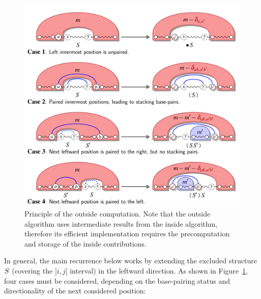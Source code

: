 \begin{figure}[t]\centering
\includegraphics[scale=\ScaleDP]{Figure2-FigDPOutsideWrapper}
\caption{Principle of the outside computation. Note that the outside algorithm uses intermediate results from the inside algorithm, 
therefore its efficient implementation requires the precomputation and storage of the inside contributions.\label{fig:outside}}
\end{figure}
In general, the main recurrence below works by extending the excluded structure $S$ (covering the $]i,j[$ interval) in the leftward direction. As shown in Figure~\ref{fig:outside}, four cases must be considered, depending on the base-pairing status and directionality of the next considered position:

